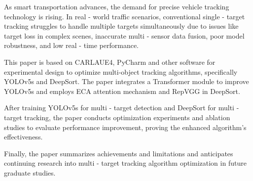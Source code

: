 \begin{abstracten}
	
	As smart transportation advances, the demand for precise vehicle tracking technology is rising. In real - world traffic scenarios, conventional single - target tracking struggles to handle multiple targets simultaneously due to issues like target loss in complex scenes, inaccurate multi - sensor data fusion, poor model robustness, and low real - time performance.
	
	This paper is based on CARLAUE4, PyCharm and other software for experimental design to optimize multi-object tracking algorithms, specifically YOLOv5s and DeepSort. The paper integrates a Transformer module to improve YOLOv5s and employs ECA attention mechanism and RepVGG in DeepSort.
	
	After training YOLOv5s for multi - target detection and DeepSort for multi - target tracking, the paper conducts optimization experiments and ablation studies to evaluate performance improvement, proving the enhanced algorithm's effectiveness.
	
	Finally, the paper summarizes achievements and limitations and anticipates continuing research into multi - target tracking algorithm optimization in future graduate studies.
	
	
	
\end{abstracten}